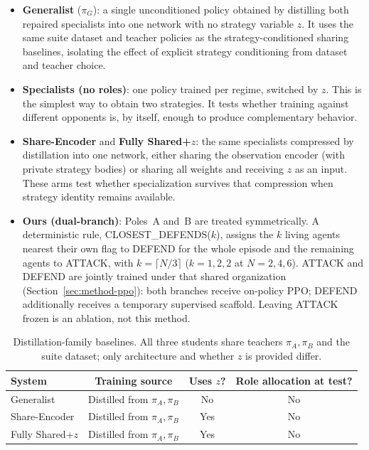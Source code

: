 \begin{itemize}
  \item \textbf{Generalist} (\(\pi_G\)): a single unconditioned policy obtained
  by distilling both repaired specialists into one network with no strategy
  variable \(z\). It uses the same suite dataset and teacher policies as the
  strategy-conditioned sharing baselines, isolating the effect of explicit
  strategy conditioning from dataset and teacher choice.
  \item \textbf{Specialists (no roles)}: one policy trained per regime,
  switched by \(z\). This is the simplest way to obtain two strategies. It
  tests whether training against different opponents is, by itself, enough to
  produce complementary behavior.
  \item \textbf{Share-Encoder} and \textbf{Fully Shared+\(z\)}: the same
  specialists compressed by distillation into one network, either sharing the
  observation encoder (with private strategy bodies) or sharing all weights
  and receiving \(z\) as an input. These arms test whether specialization
  survives that compression when strategy identity remains available.
  \item \textbf{Ours (dual-branch)}: Poles~A and~B are treated symmetrically.
  A deterministic rule, CLOSEST\_DEFENDS(\(k\)), assigns the \(k\) living
  agents nearest their own flag to DEFEND for the whole episode and the
  remaining agents to ATTACK, with \(k=\lceil N/3\rceil\)
  (\(k=1,2,2\) at \(N=2,4,6\)). ATTACK and DEFEND are jointly trained under
  that shared organization (Section~\ref{sec:method-ppo}): both branches
  receive on-policy PPO; DEFEND additionally receives a temporary supervised
  scaffold. Leaving ATTACK frozen is an ablation, not this method.
\end{itemize}

\begin{table}[t]
\centering
\caption{Distillation-family baselines. All three students share teachers
\(\pi_A,\pi_B\) and the suite dataset; only architecture and whether \(z\) is
provided differ.}
\label{tab:distill-family}
\begin{tabular}{lccc}
\hline
System & Training source & Uses \(z\)? & Role allocation at test? \\
\hline
Generalist & Distilled from \(\pi_A,\pi_B\) & No & No \\
Share-Encoder & Distilled from \(\pi_A,\pi_B\) & Yes & No \\
Fully Shared+\(z\) & Distilled from \(\pi_A,\pi_B\) & Yes & No \\
\hline
\end{tabular}
\end{table}

